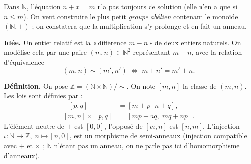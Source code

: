 ﻿%



Dans $\mathbb{N}$, l'équation $n + x = m$ n'a pas toujours de solution
(elle n'en a que si $n \leq m$). On veut construire le plus petit
\emph{groupe abélien} contenant le monoïde $(\mathbb{N}, +)$ ; on constatera
que la multiplication s'y prolonge et en fait un anneau.

\begin{tcolorbox}[thmbox]
  \textbf{Idée.}\enspace%
  Un entier relatif est la «\,différence $m - n$\,» de deux entiers naturels.
  On modélise cela par une paire $(m, n) \in \mathbb{N}^2$ représentant $m - n$,
  avec la relation d'équivalence
  \[
    (m,n) \sim (m', n') \;\iff\; m + n' = m' + n.
  \]
\end{tcolorbox}

\decsep{}


\begin{tcolorbox}[thmbox]
  \textbf{Définition.}\enspace%
  On pose $\mathbb{Z} = (\mathbb{N} \times \mathbb{N})/{\sim}$.
  On note $[m,n]$ la classe de $(m,n)$.
  Les lois sont définies par :
  \begin{align*}
    [m,n] + [p,q] &= [m+p,\; n+q], \\
    [m,n] \times [p,q] &= [mp+nq,\; mq+np].
  \end{align*}
  L'élément neutre de $+$ est $[0,0]$, l'opposé de $[m,n]$ est $[n,m]$.
  L'injection $\iota : \mathbb{N} \to \mathbb{Z},\; n \mapsto [n,0]$,
  est un morphisme de semi-anneaux (injection compatible avec $+$ et $\times$ ;
  $\mathbb{N}$ n'étant pas un anneau, on ne parle pas ici d'homomorphisme d'anneaux).
\end{tcolorbox}

